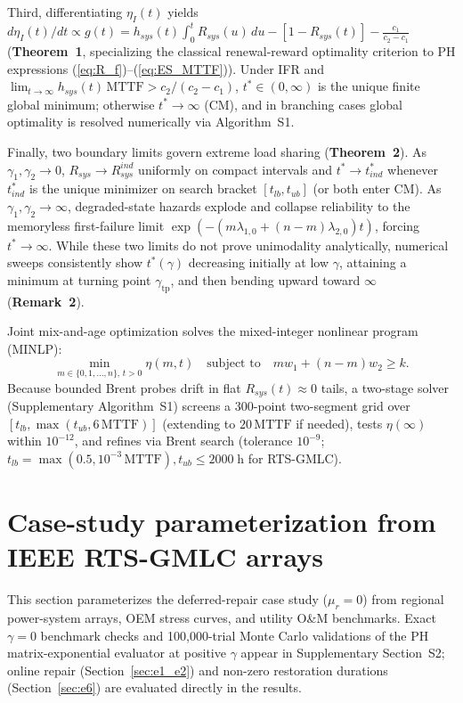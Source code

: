 \documentclass{elektr}
\begin{document}
Third, differentiating $\eta_I(t)$ yields $d \eta_I(t)/dt \propto g(t) = h_{sys}(t)\int_0^t R_{sys}(u)\,du - [1 - R_{sys}(t)] - \frac{c_1}{c_2-c_1}$ (\textbf{Theorem~1}, specializing the classical renewal-reward optimality criterion \cite{barlow1965,nakagawa2005} to PH expressions (\ref{eq:R_f})--(\ref{eq:ES_MTTF})). Under IFR and $\lim_{t\to\infty} h_{sys}(t)\,\mathrm{MTTF} > c_2/(c_2-c_1)$, $t^* \in (0, \infty)$ is the unique finite global minimum; otherwise $t^* \to \infty$ (CM), and in branching cases global optimality is resolved numerically via Algorithm~S1.

Finally, two boundary limits govern extreme load sharing (\textbf{Theorem~2}). As $\gamma_1, \gamma_2 \to 0$, $R_{sys} \to R_{sys}^{ind}$ uniformly on compact intervals and $t^* \to t_{ind}^*$ whenever $t_{ind}^*$ is the unique minimizer on search bracket $[t_{lb}, t_{ub}]$ (or both enter CM). As $\gamma_1, \gamma_2 \to \infty$, degraded-state hazards explode and collapse reliability to the memoryless first-failure limit $\exp(-(m\lambda_{1,0}+(n-m)\lambda_{2,0})t)$, forcing $t^* \to \infty$. While these two limits do not prove unimodality analytically, numerical sweeps consistently show $t^*(\gamma)$ decreasing initially at low $\gamma$, attaining a minimum at turning point $\gamma_{\mathrm{tp}}$, and then bending upward toward $\infty$ (\textbf{Remark~2}).

Joint mix-and-age optimization solves the mixed-integer nonlinear program (MINLP):
\begin{equation}
\min_{m \in \{0, 1, \dots, n\}, \, t > 0} \eta(m, t) \quad \text{subject to} \quad m w_1 + (n - m) w_2 \ge k.
\label{eq:minlp}
\end{equation}
Because bounded Brent probes drift in flat $R_{sys}(t) \approx 0$ tails, a two-stage solver (Supplementary Algorithm~S1) screens a 300-point two-segment grid over $[t_{lb}, \max(t_{ub}, 6\,\mathrm{MTTF})]$ (extending to $20\,\mathrm{MTTF}$ if needed), tests $\eta(\infty)$ within $10^{-12}$, and refines via Brent search (tolerance $10^{-9}$; $t_{lb} = \max(0.5, 10^{-3}\,\mathrm{MTTF}), t_{ub} \le 2000\;\text{h}$ for RTS-GMLC).

\section{Case-study parameterization from IEEE RTS-GMLC arrays}
\label{sec:case_data}

This section parameterizes the deferred-repair case study ($\mu_r = 0$) from regional power-system arrays, OEM stress curves, and utility O\&M benchmarks. Exact $\gamma = 0$ benchmark checks and 100,000-trial Monte Carlo validations of the PH matrix-exponential evaluator at positive $\gamma$ appear in Supplementary Section~S2; online repair (Section~\ref{sec:e1_e2}) and non-zero restoration durations (Section~\ref{sec:e6}) are evaluated directly in the results.
\end{document}
